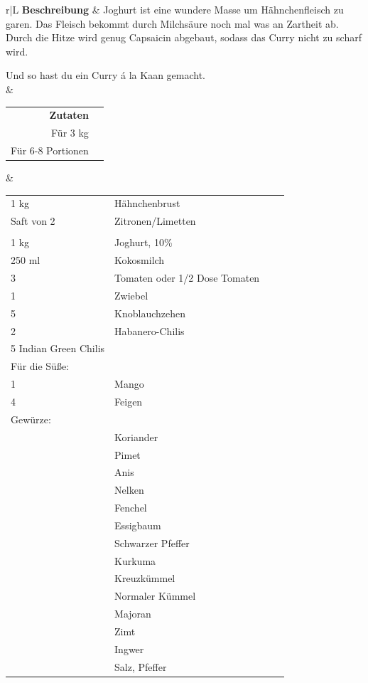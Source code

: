 \documentclass[a4paper, 12pt]{scrbook} 								%
\numberwithin{equation}{section} 									%
\begin{document}
			\begin{tabularx}{\textwidth}{r|L}
				\textbf{Beschreibung}	&	Joghurt ist eine wundere Masse um Hähnchenfleisch zu garen. Das Fleisch bekommt durch Milchsäure noch mal was an Zartheit ab. Durch die Hitze wird genug Capsaicin abgebaut, sodass das Curry nicht zu scharf wird.

				Und so hast du ein Curry á la Kaan gemacht.\\
										&	\\
				\begin{tabular}[t]{rr}
					\textbf{Zutaten}	\\
					Für 3 kg 			\\
					Für 6-8 Portionen	\\
				\end{tabular}			&	\begin{tabular}[t]{llll}
												1 kg & Hähnchenbrust \\
												Saft von 2 & Zitronen/Limetten \\
												\\
												1 kg & Joghurt, 10\% \\
												250 ml & Kokosmilch \\ 
												3 &Tomaten oder 1/2 Dose Tomaten \\
												1 & Zwiebel \\
												5 & Knoblauchzehen \\
												2 & Habanero-Chilis \\
												5 Indian Green Chilis \\
												Für die Süße: \\
												1 & Mango \\
												4 & Feigen \\
												Gewürze: \\
												& Koriander \\
												& Pimet \\
												& Anis \\
												& Nelken \\
												& Fenchel \\
												& Essigbaum \\
												& Schwarzer Pfeffer \\
												& Kurkuma \\
												& Kreuzkümmel \\ 
												& Normaler Kümmel \\ 
												& Majoran \\
												& Zimt \\
												& Ingwer \\ 
												& Salz, Pfeffer \\

											\end{tabular}	\\
				\end{tabularx}
\end{document}
